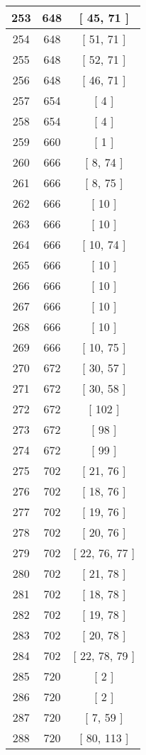 \begin{center}
\begin{longtable}[H]{|| c c c ||}
\hline
253 & 648 & [ 45, 71 ] \\ 
\hline
254 & 648 & [ 51, 71 ] \\ 
\hline
255 & 648 & [ 52, 71 ] \\ 
\hline
256 & 648 & [ 46, 71 ] \\ 
\hline
257 & 654 & [ 4 ] \\ 
\hline
258 & 654 & [ 4 ] \\ 
\hline
259 & 660 & [ 1 ] \\ 
\hline
260 & 666 & [ 8, 74 ] \\ 
\hline
261 & 666 & [ 8, 75 ] \\ 
\hline
262 & 666 & [ 10 ] \\ 
\hline
263 & 666 & [ 10 ] \\ 
\hline
264 & 666 & [ 10, 74 ] \\ 
\hline
265 & 666 & [ 10 ] \\ 
\hline
266 & 666 & [ 10 ] \\ 
\hline
267 & 666 & [ 10 ] \\ 
\hline
268 & 666 & [ 10 ] \\ 
\hline
269 & 666 & [ 10, 75 ] \\ 
\hline
270 & 672 & [ 30, 57 ] \\ 
\hline
271 & 672 & [ 30, 58 ] \\ 
\hline
272 & 672 & [ 102 ] \\ 
\hline
273 & 672 & [ 98 ] \\ 
\hline
274 & 672 & [ 99 ] \\ 
\hline
275 & 702 & [ 21, 76 ] \\ 
\hline
276 & 702 & [ 18, 76 ] \\ 
\hline
277 & 702 & [ 19, 76 ] \\ 
\hline
278 & 702 & [ 20, 76 ] \\ 
\hline
279 & 702 & [ 22, 76, 77 ] \\ 
\hline
280 & 702 & [ 21, 78 ] \\ 
\hline
281 & 702 & [ 18, 78 ] \\ 
\hline
282 & 702 & [ 19, 78 ] \\ 
\hline
283 & 702 & [ 20, 78 ] \\ 
\hline
284 & 702 & [ 22, 78, 79 ] \\ 
\hline
285 & 720 & [ 2 ] \\ 
\hline
286 & 720 & [ 2 ] \\ 
\hline
287 & 720 & [ 7, 59 ] \\ 
\hline
288 & 720 & [ 80, 113 ] \\ 

\end{longtable}
\end{center}
